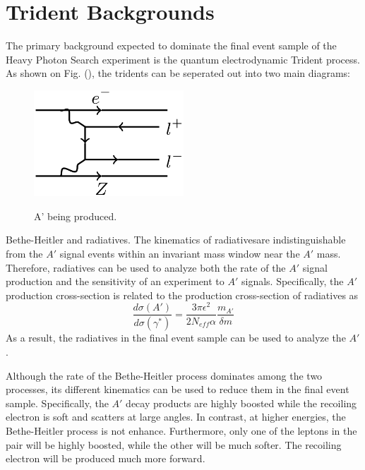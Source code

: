 \section{Trident Backgrounds}

The primary background expected to dominate the final event sample of the Heavy
Photon Search experiment is the quantum electrodynamic Trident process.  As 
shown on Fig. (), the tridents can be seperated out into two main diagrams: 
\begin{figure}[t]
    \centering
    \caption{A' being produced.}
    \includegraphics[width=0.5\textwidth]{images/bethe-heitler.png}
    \label{fig:tridents}
\end{figure}  
Bethe-Heitler and radiatives. The kinematics of radiativesare indistinguishable
from the $A'$ signal events within an invariant mass window near the $A'$ mass.
Therefore, radiatives can be used to analyze both the rate of the $A'$ signal 
production and the sensitivity of an experiment to $A'$ signals.  Specifically,
the $A'$ production cross-section is related to the production cross-section of 
radiatives as 
\[
    \frac{d\sigma(A')}{d\sigma(\gamma^*)} = \frac{3\pi\epsilon^{2}}{2 N_{eff} \alpha}
        \frac{m_{A'}}{\delta m}
\]
As a result, the radiatives in the final event sample can be used to analyze 
the $A'$.

Although the rate of the Bethe-Heitler process dominates among the two processes, 
its different kinematics can be used to reduce them in the final event sample.
Specifically, the $A'$ decay products are highly boosted while the recoiling 
electron is soft and scatters at large angles.  In contrast, at higher 
energies, the Bethe-Heitler process is not enhance.  Furthermore, only one of
the leptons in the pair will be highly boosted, while the other will be much
softer.  The recoiling electron will be produced much more forward.


